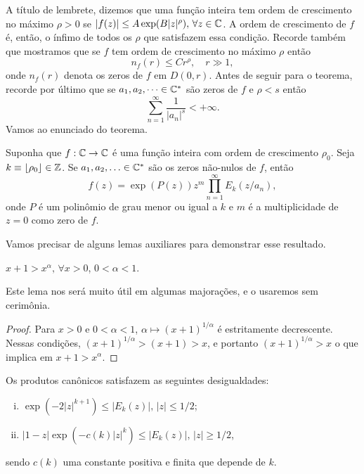     A título de lembrete, dizemos que uma função inteira tem ordem de crescimento no máximo
    $\rho > 0$ se $|f(z)| \leq A\exp(B|z|^{\rho}), \, \forall z\in\mathbb{C}$. A ordem de 
    crescimento de $f$ é, então, o ínfimo de todos os $\rho$ que satisfazem essa
    condição. Recorde também que mostramos que se $f$ tem ordem de crescimento no
    máximo $\rho$ então
    \[
        n_f(r) \leq Cr^{\rho}, \quad r \gg 1,
    \]
    onde $n_f(r)$ denota os zeros de $f$ em $D(0, r)$. Antes de seguir para o teorema, 
    recorde por último que se $a_1, a_2, \dots \in\mathbb{C}^*$ são zeros de $f$ e $\rho < s$
    então
    \[
        \sum_{n=1}^{\infty} \frac{1}{|a_n|^s} < +\infty.
    \]
    Vamos ao enunciado do teorema.
    \begin{teorema}
    \label{teo:fatoracao-hadamard}
        Suponha que $f:\mathbb{C}\to\mathbb{C}$ é uma função inteira com ordem de crescimento $\rho_0$.
        Seja $k\equiv \lfloor \rho_0 \rfloor \in \mathbb{Z}$. 
        Se $a_1, a_2, \ldots \in\mathbb{C}^*$ são os 
        zeros não-nulos de $f$, então
        \[
            f(z) = \exp(P(z))z^m\prod_{n=1}^{\infty} E_k(z/a_n),
        \]
        onde $P$ é um polinômio de grau menor ou igual a $k$ e $m$ é a multiplicidade
        de $z=0$ como zero de $f$.
    \end{teorema}
    Vamos precisar de alguns lemas auxiliares para demonstrar esse resultado.
    \begin{lema}
    \label{lema:majoracao}
        $x+1 > x^\alpha, \, \forall x>0$, 
        $0 < \alpha < 1$.
    \end{lema}
    Este lema nos será muito útil em algumas majorações, e o usaremos sem cerimônia.
    \begin{proof}
        Para $x>0$ e $0<\alpha<1$,
        $\alpha \mapsto (x+1)^{1/\alpha}$ 
        é estritamente decrescente. 
        Nessas condições,
        $(x+1)^{1/\alpha} > (x+1) > x$,
        e portanto 
        $(x+1)^{1/\alpha} > x$ 
        o que implica em
        $x+1 > x^\alpha$. 
    \end{proof}
    \begin{lema}
    \label{lema:5.2-Stein}
        Os produtos canônicos satisfazem as seguintes desigualdades:
        \begin{enumerate}[i)]
            \item $\exp( -2|z|^{k+1} ) \leq |E_k(z)|, \, |z| \leq 1/2$;
            \item $|1 - z|\exp( -c(k)|z|^k ) \leq |E_k(z)|, \, |z| \geq 1/2$,
        \end{enumerate}
        sendo $c(k)$ uma constante positiva e finita que depende de $k$.
    \end{lema}

